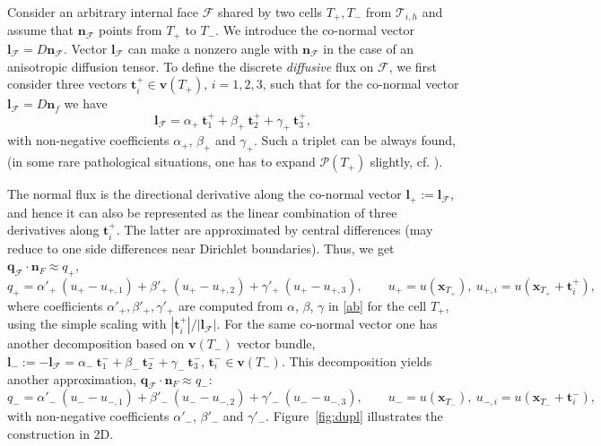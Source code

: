 \documentclass{article}
\newcommand{\bn}{\mathbf n}
\newcommand{\bv}{\mathbf v}
\newcommand{\bl}{\mathbf l}
\newcommand{\bx}{\mathbf x}
\newcommand{\bq}{\mathbf q}
\newcommand{\bt}{\mathbf t}
\newcommand{\F}{\mathcal F}
\newcommand{\T}{\mathcal T}
\begin{document}
Consider an arbitrary internal face $\F$ shared by two cells $T_+, T_-$ from $\T_{i,h}$ and assume that $\bn_\F$ points from $T_+$ to $T_-$. We introduce the co-normal vector $\bl_{\F}= D \bn_\F$.
Vector $\bl_{\F}$  can make a nonzero angle with $\bn_\F$ in the case of an anisotropic diffusion tensor.
To define the discrete {\em diffusive} flux on $\F$, we first %
consider three vectors $\bt_{i}^+\in \bv(T_+)$, $i=1,2,3$,
such that for the co-normal vector $\bl_{\F} = D \bn_f$ we have
\begin{equation}\label{ab}
  \bl_{\F} =
  \alpha_+~ \bt_{1}^+ + \beta_+~ \bt_{2}^+ + \gamma_+~ \bt_{3}^+,
\end{equation}
with non-negative coefficients $\alpha_+$, $\beta_+$ and $\gamma_+$. Such a triplet can be always found,  (in some rare pathological situations, one has to expand $\mathcal{P}(T_+)$ slightly, cf. \cite{DanilovVassilevski:09}).

The normal flux is the directional derivative along the co-normal vector $\bl_+ := \bl_{\F}$, and hence
it can also be represented as the linear combination of three derivatives along $\bt_{i}^+$. The latter  are approximated by central differences (may reduce to one side differences near Dirichlet boundaries). Thus, we get
$\bq_\F\cdot\bn_F\approx q_+$,
\begin{equation}\label{ab2}
 q_+=
  \alpha'_{+}~ (u_+ - u_{+,1}) + \beta'_{+}~ (u_+ - u_{+,2}) +
  \gamma'_{+}~ (u_+ - u_{+,3}),\qquad u_+=u(\bx_{T_+}),~ u_{+,i}=u(\bx_{T_+}+\bt_{i}^+),
\end{equation}
where coefficients $\alpha'_{+}, \beta'_{+}, \gamma'_{+}$ are computed from $\alpha$, $\beta$, $\gamma$ in  \eqref{ab}
for the cell $T_+$, using the simple  scaling with $|\bt_{i}^+| / |\bl_{\F}|$.
For the same co-normal vector one has  another decomposition based on $\bv(T_-)$ vector bundle,
$
\bl_- := -\bl_{\F} =
  \alpha_-~ \bt_{1}^- + \beta_-~ \bt_{2}^- + \gamma_-~ \bt_{3}^-$, $\bt_{i}^-\in \bv(T_-)$. This decomposition yields another approximation,  $\bq_\F\cdot\bn_F\approx q_-$:
\begin{equation}\label{ab3}
  q_- =
  \alpha'_{-}~ (u_- - u_{-,1}) + \beta'_{-}~ (u_- - u_{-,2}) +
  \gamma'_{-}~ (u_- - u_{-,3}),\qquad u_-=u(\bx_{T_-}),~ u_{-,i}=u(\bx_{T_-}+\bt_{i}^-),
\end{equation}
with non-negative coefficients $\alpha'_-$, $\beta'_-$ and $\gamma'_-$. Figure~\ref{fig:dupl} illustrates the construction in 2D.
\end{document}

